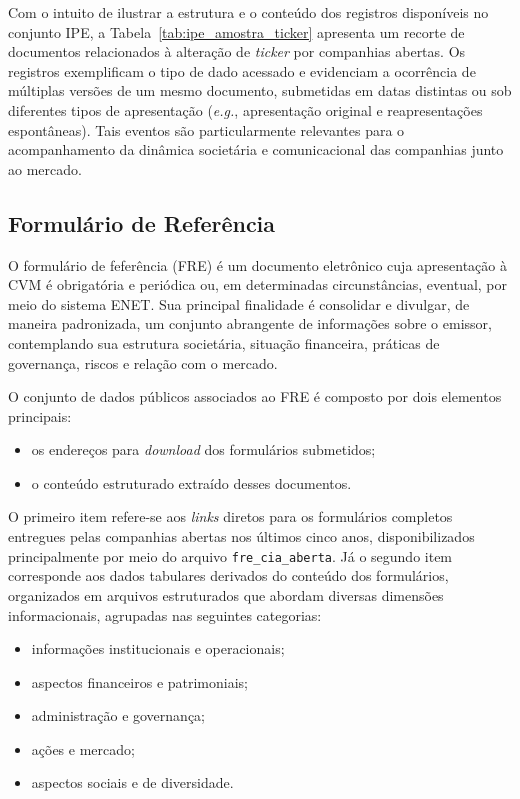 Com o intuito de ilustrar a estrutura e o conteúdo dos registros disponíveis no conjunto IPE, a Tabela~\ref{tab:ipe_amostra_ticker} apresenta um recorte de documentos relacionados à alteração de \textit{ticker} por companhias abertas. Os registros exemplificam o tipo de dado acessado e evidenciam a ocorrência de múltiplas versões de um mesmo documento, submetidas em datas distintas ou sob diferentes tipos de apresentação (\textit{e.g.}, apresentação original e reapresentações espontâneas). Tais eventos são particularmente relevantes para o acompanhamento da dinâmica societária e comunicacional das companhias junto ao mercado.



\subsection{Formulário de Referência}

O formulário de feferência (FRE) é um documento eletrônico cuja apresentação à CVM é obrigatória e periódica ou, em determinadas circunstâncias, eventual, por meio do sistema ENET. Sua principal finalidade é consolidar e divulgar, de maneira padronizada, um conjunto abrangente de informações sobre o emissor, contemplando sua estrutura societária, situação financeira, práticas de governança, riscos e relação com o mercado.

O conjunto de dados públicos associados ao FRE é composto por dois elementos principais:

\begin{itemize}
	\item os endereços para \textit{download} dos formulários submetidos;
	\item o conteúdo estruturado extraído desses documentos.
\end{itemize}

O primeiro item refere-se aos \textit{links} diretos para os formulários completos entregues pelas companhias abertas nos últimos cinco anos, disponibilizados principalmente por meio do arquivo \texttt{fre\_cia\_aberta}. Já o segundo item corresponde aos dados tabulares derivados do conteúdo dos formulários, organizados em arquivos estruturados que abordam diversas dimensões informacionais, agrupadas nas seguintes categorias:

\begin{itemize}
	\item informações institucionais e operacionais;
	\item aspectos financeiros e patrimoniais;
	\item administração e governança;
	\item ações e mercado;
	\item aspectos sociais e de diversidade.
\end{itemize}

